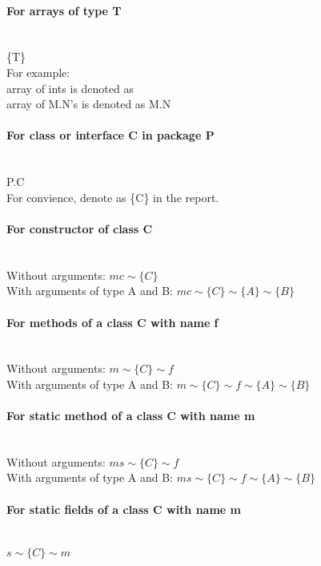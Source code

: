 \documentclass[12pt, a4paper]{article}
\begin{document}
\paragraph{For arrays of type T\\}
\noindent \\
\textdollar\{T\} \\
For example: \\
\indent array of ints is denoted as \textdollar@int \\
\indent array of M.N’s is denoted as \textdollar M.N

\paragraph{For class or interface C in package P\\}
\noindent \\
P.C \\
For convience, denote as \{C\} in the report.

\paragraph{For constructor of class C\\}
\noindent \\
Without arguments: $mc\sim\{C\}$ \\
With arguments of type A and B: $mc\sim\{C\}\sim\{A\}\sim\{B\}$ 

\paragraph{For methods of a class C with name f\\}
\noindent \\
Without arguments: $m\sim\{C\}\sim f$ \\
With arguments of type A and B: $m\sim\{C\}\sim f\sim\{A\}\sim\{B\}$

\paragraph{For static method of a class C with name m\\}
\noindent \\
Without arguments: $ms\sim\{C\}\sim f$ \\
With arguments of type A and B: $ms\sim\{C\}\sim f\sim\{A\}\sim\{B\}$

\paragraph{For static fields of a class C with name m\\}
\noindent \\
$s\sim\{C\}\sim m$ \\
\end{document}
